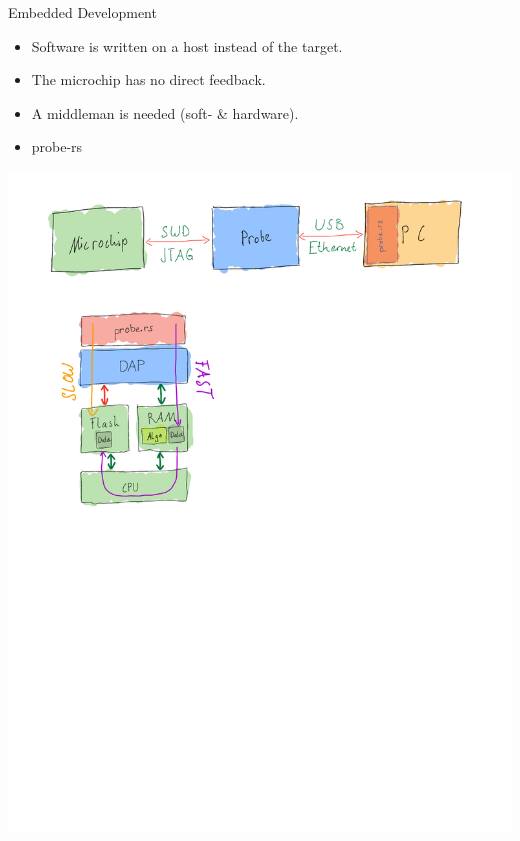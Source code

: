 \documentclass[aspectratio=1610,14pt,t]{beamer}
\begin{document}
\begin{frame}[c]{Embedded Development}
  \begin{itemize}
    \item Software is written on a host instead of the target.
    \item The microchip has no direct feedback.
    \item A middleman is needed (soft- \& hardware).
    \item probe-rs
  \end{itemize}
  \includegraphics[trim=0 23cm 0 0, clip, height=0.4\textheight]{./img/probe-chain.pdf}
\end{frame}
\end{document}
